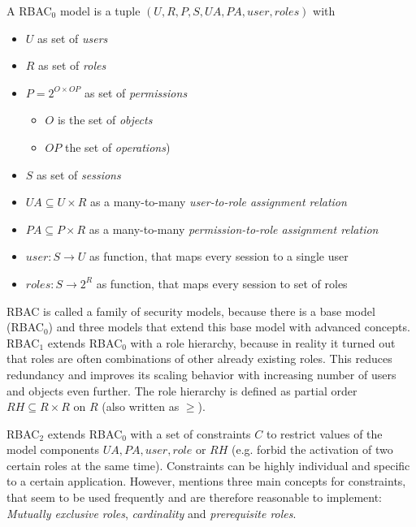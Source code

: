 \documentclass[twoside, openright, 12pt]{book}
\begin{document}
\begin{xdefinition}[RBAC] 
A RBAC$_0$ model is a tuple $(U, R, P, S, UA, PA, user, roles)$ with

\vspace{-2mm}
\begin{itemize}
\setlength\itemsep{0em}
\item $U$ as set of \textit{users}
\item $R$ as set of \textit{roles}
\item $P = 2^{O \times OP}$ as set of \textit{permissions}
\vspace{-2mm}
\begin{itemize}
\item $O$ is the set of \textit{objects}
\item $OP$ the set of \textit{operations})
\end{itemize}
\vspace{-2mm}
\item $S$ as set of \textit{sessions}
\item $UA \subseteq U \times R$ as a many-to-many \textit{user-to-role assignment relation}
\item $PA \subseteq P \times R$ as a many-to-many \textit{permission-to-role assignment relation}
\item $user: S \rightarrow U$ as function, that maps every session to a single user
\item $roles: S \rightarrow 2^R$ as function, that maps every session to set of roles
\end{itemize}
\end{xdefinition}

\noindent
RBAC is called a family of security models, because there is a base model (RBAC$_0$) and three models that extend this base model with advanced concepts.
RBAC$_1$ extends RBAC$_0$ with a role hierarchy, because in reality it turned out that roles are often combinations of other already existing roles.
This reduces redundancy and improves its scaling behavior with increasing number of users and objects even further.
The role hierarchy is defined as partial order $RH \subseteq R \times R$ on $R$ (also written as $\geq$).

RBAC$_2$ extends RBAC$_0$ with a set of constraints $C$ to restrict values of the model components $UA, PA, user, role$ or $RH$ (e.g. forbid the activation of two certain roles at the same time).
Constraints can be highly individual and specific to a certain application.
However, \cite{Sandhu96} mentions three main concepts for constraints, that seem to be used frequently and are therefore reasonable to implement: \textit{Mutually exclusive roles}, \textit{cardinality} and \textit{prerequisite roles}.
\end{document}
